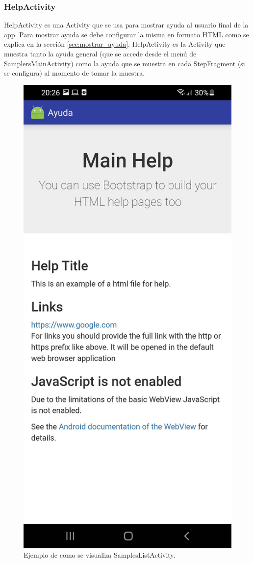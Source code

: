 \subsubsection{HelpActivity}
HelpActivity es una Activity que se usa para mostrar ayuda al usuario final de la app. Para mostrar ayuda se debe configurar la misma en formato HTML como se explica en la sección \ref{sec:mostrar_ayuda}. HelpActivity es la Activity que muestra tanto la ayuda general (que se accede desde el menú de SamplersMainActivity) como la ayuda que se muestra en cada StepFragment (si se configura) al momento de tomar la muestra.

\begin{figure}[H]
  \centering
    \includegraphics[scale=0.3]{05-implementacion/HelpActivity.png} 
   \caption{Ejemplo de como se visualiza SamplesListActivity.}
\end{figure}	







